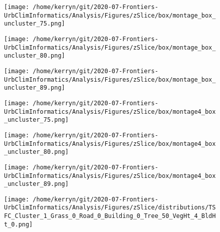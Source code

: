 \documentclass{article}
\begin{document}
\begin{figure}
\centering    
\texttt{[image: /home/kerryn/git/2020-07-Frontiers-UrbClimInformatics/Analysis/Figures/zSlice/box/montage\_box\_uncluster\_75.png]}
\end{figure} 
\clearpage

\begin{figure}
\centering    
\texttt{[image: /home/kerryn/git/2020-07-Frontiers-UrbClimInformatics/Analysis/Figures/zSlice/box/montage\_box\_uncluster\_80.png]}
\end{figure} 
\clearpage


\begin{figure}
\centering    
\texttt{[image: /home/kerryn/git/2020-07-Frontiers-UrbClimInformatics/Analysis/Figures/zSlice/box/montage\_box\_uncluster\_89.png]}
\end{figure} 
\clearpage





\begin{figure}
\centering    
\texttt{[image: /home/kerryn/git/2020-07-Frontiers-UrbClimInformatics/Analysis/Figures/zSlice/box/montage4\_box\_uncluster\_75.png]}
\end{figure} 
\clearpage

\begin{figure}
\centering    
\texttt{[image: /home/kerryn/git/2020-07-Frontiers-UrbClimInformatics/Analysis/Figures/zSlice/box/montage4\_box\_uncluster\_80.png]}
\end{figure} 
\clearpage


\begin{figure}
\centering    
\texttt{[image: /home/kerryn/git/2020-07-Frontiers-UrbClimInformatics/Analysis/Figures/zSlice/box/montage4\_box\_uncluster\_89.png]}
\end{figure} 
\clearpage




\begin{figure}
\centering    
\texttt{[image: /home/kerryn/git/2020-07-Frontiers-UrbClimInformatics/Analysis/Figures/zSlice/distributions/TSFC\_Cluster\_1\_Grass\_0\_Road\_0\_Building\_0\_Tree\_50\_VegHt\_4\_BldHt\_0.png]}
\end{figure} 
\clearpage
\end{document}
